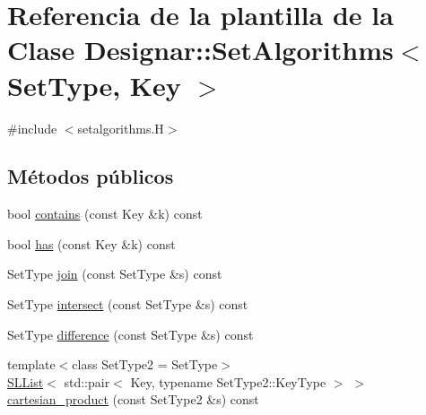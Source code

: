 \hypertarget{class_designar_1_1_set_algorithms}{}\section{Referencia de la plantilla de la Clase Designar\+:\+:Set\+Algorithms$<$ Set\+Type, Key $>$}
\label{class_designar_1_1_set_algorithms}


{\ttfamily \#include $<$setalgorithms.\+H$>$}

\subsection*{Métodos públicos}
\begin{DoxyCompactItemize}
\item 
bool \hyperlink{class_designar_1_1_set_algorithms_a490a87d0cb7793ce6ef065affa89bd42}{contains} (const Key \&k) const
\item 
bool \hyperlink{class_designar_1_1_set_algorithms_a9427240bf90b69bd89135903570a8439}{has} (const Key \&k) const
\item 
Set\+Type \hyperlink{class_designar_1_1_set_algorithms_aebbac6e18649aa234b273960575ecec9}{join} (const Set\+Type \&s) const
\item 
Set\+Type \hyperlink{class_designar_1_1_set_algorithms_ae5eccd220351a0b473135c3a3dda01e2}{intersect} (const Set\+Type \&s) const
\item 
Set\+Type \hyperlink{class_designar_1_1_set_algorithms_a0f266c5f84c89f6a79ca21ec97eb7661}{difference} (const Set\+Type \&s) const
\item 
{\footnotesize template$<$class Set\+Type2  = Set\+Type$>$ }\\\hyperlink{class_designar_1_1_s_l_list}{S\+L\+List}$<$ std\+::pair$<$ Key, typename Set\+Type2\+::\+Key\+Type $>$ $>$ \hyperlink{class_designar_1_1_set_algorithms_a10ba40d1455ea532b1c1b56cc4092d75}{cartesian\+\_\+product} (const Set\+Type2 \&s) const
\end{DoxyCompactItemize}
